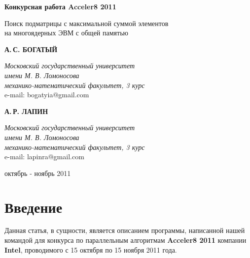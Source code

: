 \documentclass[12pt,a4paper]{article}
\begin{document}
\newcommand{\parw}[2]{\dfrac{\partial #1}{\partial #2}}
\newcommand{\pl}{p_{\lambda}}
\newcommand{\pa}{p_{a}}
\newcommand{\mn}[1]{ \{ {#1} \} }
\newcommand{\pgm}{p_{m, \sigma^2}}
\newcommand{\pma}{p_{M, a}}
\newcommand{\xseqn}{x_1, \ldots, x_n}
\newcommand{\nd}[1]{\frac{1}{\sqrt{2 \pi #1^2}} \exp ( -{\frac{x^2}{2 #1^2}} ) }
\newcommand{\ndm}[2]{\frac{1}{\sqrt{2 \pi #2^2}} \exp ( - {\frac{(x - #1)^2}{2 #2^2}})}
\newcommand{\ndms}[3]{\frac{1}{(\sqrt{2 \pi #2^2})^n} \exp ( - \sum\limits_{i = 1}^{#3}{\frac{(x_i - #1)^2}{2 #2^2}})}
\renewcommand{\le}{\leqslant}
\renewcommand{\ge}{\geqslant}

\newcommand*{\hm}[1]{#1\nobreak\discretionary{}%
{\hbox{$\mathsurround=0pt #1$}}{}}

\begin{titlepage}
\begin{center}
\huge{\textbf{Конкурсная работа Acceler8 2011}

\bigskip
\Large{Поиск подматрицы с максимальной суммой элементов\\ на многоядерных ЭВМ с общей памятью}}
\end{center}

\begin{flushright}
\textbf{А.\,С. БОГАТЫЙ}

\textit{Московский государственный университет\\имени М. В. Ломоносова\\механико-математический факультет, 3 курс\\}
e-mail: bogatyia@gmail.com

\bigskip
\textbf{А.\,Р. ЛАПИН}

\textit{Московский государственный университет\\имени М. В. Ломоносова\\механико-математический факультет, 3 курс\\}
e-mail: lapinra@gmail.com\\[70pt]
\end{flushright}

\begin{center}
октябрь - ноябрь 2011
\end{center}
\end{titlepage}


\section{Введение}
Данная статья, в сущности, является описанием программы, написанной нашей командой для конкурса по параллельным алгоритмам \textbf{Acceler8 2011}  компании \textbf{Intel}, проводимого с 15 октября по 15 ноября 2011 года. 
\end{document}

